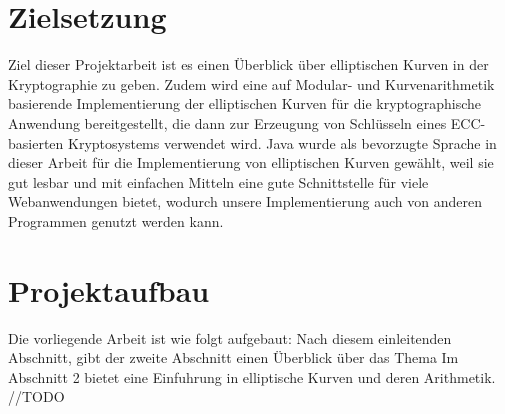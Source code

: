 \section{Zielsetzung}

Ziel dieser Projektarbeit ist es einen Überblick über elliptischen Kurven in der Kryptographie zu geben. 
Zudem wird eine auf Modular- und Kurvenarithmetik basierende Implementierung der elliptischen Kurven für die kryptographische Anwendung bereitgestellt, die dann zur  Erzeugung von Schlüsseln eines ECC-basierten Kryptosystems verwendet wird.
Java wurde als bevorzugte Sprache in dieser Arbeit für die Implementierung von elliptischen Kurven gewählt, weil sie gut lesbar und mit einfachen Mitteln eine gute Schnittstelle für viele Webanwendungen bietet, wodurch unsere Implementierung auch von anderen Programmen genutzt werden kann. 

\section{Projektaufbau}


Die vorliegende Arbeit ist wie folgt aufgebaut: Nach diesem einleitenden Abschnitt, gibt der zweite Abschnitt einen Überblick über das Thema
Im Abschnitt 2 bietet eine Einfuhrung in elliptische Kurven und deren Arithmetik. //TODO
